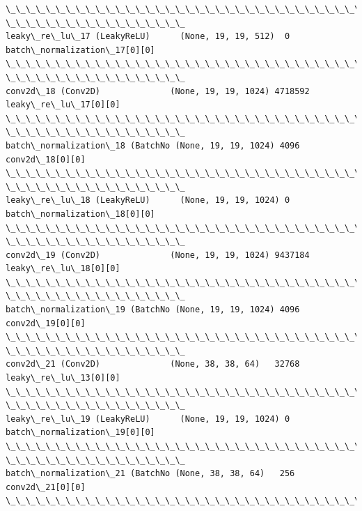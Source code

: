 \documentclass[11pt]{article}
\begin{document}
\begin{Verbatim}[commandchars=\\\{\}]
\_\_\_\_\_\_\_\_\_\_\_\_\_\_\_\_\_\_\_\_\_\_\_\_\_\_\_\_\_\_\_\_\_\_\_\_\_\_\_\_\_\_\_\_\_\_\_\_\_\_\_\_\_\_\_\_\_\_\_\_\_\_\_\_\_\_\_\_\_\_\_\_\_\_\_\_\_\_\_\_
\_\_\_\_\_\_\_\_\_\_\_\_\_\_\_\_\_\_
leaky\_re\_lu\_17 (LeakyReLU)      (None, 19, 19, 512)  0
batch\_normalization\_17[0][0]
\_\_\_\_\_\_\_\_\_\_\_\_\_\_\_\_\_\_\_\_\_\_\_\_\_\_\_\_\_\_\_\_\_\_\_\_\_\_\_\_\_\_\_\_\_\_\_\_\_\_\_\_\_\_\_\_\_\_\_\_\_\_\_\_\_\_\_\_\_\_\_\_\_\_\_\_\_\_\_\_
\_\_\_\_\_\_\_\_\_\_\_\_\_\_\_\_\_\_
conv2d\_18 (Conv2D)              (None, 19, 19, 1024) 4718592
leaky\_re\_lu\_17[0][0]
\_\_\_\_\_\_\_\_\_\_\_\_\_\_\_\_\_\_\_\_\_\_\_\_\_\_\_\_\_\_\_\_\_\_\_\_\_\_\_\_\_\_\_\_\_\_\_\_\_\_\_\_\_\_\_\_\_\_\_\_\_\_\_\_\_\_\_\_\_\_\_\_\_\_\_\_\_\_\_\_
\_\_\_\_\_\_\_\_\_\_\_\_\_\_\_\_\_\_
batch\_normalization\_18 (BatchNo (None, 19, 19, 1024) 4096        conv2d\_18[0][0]
\_\_\_\_\_\_\_\_\_\_\_\_\_\_\_\_\_\_\_\_\_\_\_\_\_\_\_\_\_\_\_\_\_\_\_\_\_\_\_\_\_\_\_\_\_\_\_\_\_\_\_\_\_\_\_\_\_\_\_\_\_\_\_\_\_\_\_\_\_\_\_\_\_\_\_\_\_\_\_\_
\_\_\_\_\_\_\_\_\_\_\_\_\_\_\_\_\_\_
leaky\_re\_lu\_18 (LeakyReLU)      (None, 19, 19, 1024) 0
batch\_normalization\_18[0][0]
\_\_\_\_\_\_\_\_\_\_\_\_\_\_\_\_\_\_\_\_\_\_\_\_\_\_\_\_\_\_\_\_\_\_\_\_\_\_\_\_\_\_\_\_\_\_\_\_\_\_\_\_\_\_\_\_\_\_\_\_\_\_\_\_\_\_\_\_\_\_\_\_\_\_\_\_\_\_\_\_
\_\_\_\_\_\_\_\_\_\_\_\_\_\_\_\_\_\_
conv2d\_19 (Conv2D)              (None, 19, 19, 1024) 9437184
leaky\_re\_lu\_18[0][0]
\_\_\_\_\_\_\_\_\_\_\_\_\_\_\_\_\_\_\_\_\_\_\_\_\_\_\_\_\_\_\_\_\_\_\_\_\_\_\_\_\_\_\_\_\_\_\_\_\_\_\_\_\_\_\_\_\_\_\_\_\_\_\_\_\_\_\_\_\_\_\_\_\_\_\_\_\_\_\_\_
\_\_\_\_\_\_\_\_\_\_\_\_\_\_\_\_\_\_
batch\_normalization\_19 (BatchNo (None, 19, 19, 1024) 4096        conv2d\_19[0][0]
\_\_\_\_\_\_\_\_\_\_\_\_\_\_\_\_\_\_\_\_\_\_\_\_\_\_\_\_\_\_\_\_\_\_\_\_\_\_\_\_\_\_\_\_\_\_\_\_\_\_\_\_\_\_\_\_\_\_\_\_\_\_\_\_\_\_\_\_\_\_\_\_\_\_\_\_\_\_\_\_
\_\_\_\_\_\_\_\_\_\_\_\_\_\_\_\_\_\_
conv2d\_21 (Conv2D)              (None, 38, 38, 64)   32768
leaky\_re\_lu\_13[0][0]
\_\_\_\_\_\_\_\_\_\_\_\_\_\_\_\_\_\_\_\_\_\_\_\_\_\_\_\_\_\_\_\_\_\_\_\_\_\_\_\_\_\_\_\_\_\_\_\_\_\_\_\_\_\_\_\_\_\_\_\_\_\_\_\_\_\_\_\_\_\_\_\_\_\_\_\_\_\_\_\_
\_\_\_\_\_\_\_\_\_\_\_\_\_\_\_\_\_\_
leaky\_re\_lu\_19 (LeakyReLU)      (None, 19, 19, 1024) 0
batch\_normalization\_19[0][0]
\_\_\_\_\_\_\_\_\_\_\_\_\_\_\_\_\_\_\_\_\_\_\_\_\_\_\_\_\_\_\_\_\_\_\_\_\_\_\_\_\_\_\_\_\_\_\_\_\_\_\_\_\_\_\_\_\_\_\_\_\_\_\_\_\_\_\_\_\_\_\_\_\_\_\_\_\_\_\_\_
\_\_\_\_\_\_\_\_\_\_\_\_\_\_\_\_\_\_
batch\_normalization\_21 (BatchNo (None, 38, 38, 64)   256         conv2d\_21[0][0]
\_\_\_\_\_\_\_\_\_\_\_\_\_\_\_\_\_\_\_\_\_\_\_\_\_\_\_\_\_\_\_\_\_\_\_\_\_\_\_\_\_\_\_\_\_\_\_\_\_\_\_\_\_\_\_\_\_\_\_\_\_\_\_\_\_\_\_\_\_\_\_\_\_\_\_\_\_\_\_\_

\end{Verbatim}
\end{document}
